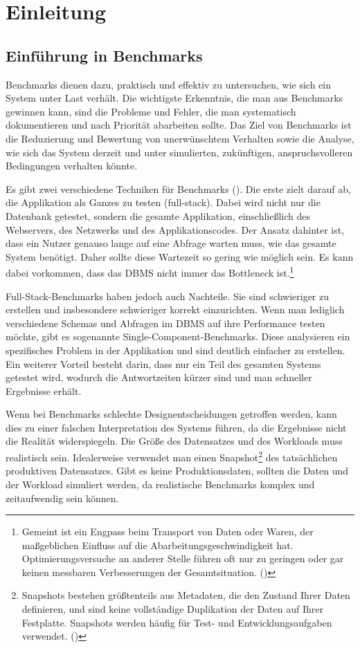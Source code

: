 \chapter{Einleitung}\label{ch:einleitung}

\section{Einführung in Benchmarks}\label{sec:einleitung-einfuehrung}

Benchmarks dienen dazu, praktisch und effektiv zu untersuchen, wie sich ein System unter Last verhält.
Die wichtigste Erkenntnis, die man aus Benchmarks gewinnen kann, sind die Probleme und Fehler, die man systematisch dokumentieren und nach Priorität abarbeiten sollte.
Das Ziel von Benchmarks ist die Reduzierung und Bewertung von unerwünschtem Verhalten sowie die Analyse, wie sich das System derzeit und unter simulierten, zukünftigen, anspruchsvolleren Bedingungen verhalten könnte.

Es gibt zwei verschiedene Techniken für Benchmarks (\cite[pp. 35--49]{schwartz2012high}).
Die erste zielt darauf ab, die Applikation als Ganzes zu testen (full-stack).
Dabei wird nicht nur die Datenbank getestet, sondern die gesamte Applikation, einschließlich des Webservers,
des Netzwerks und des Applikationscodes.
Der Ansatz dahinter ist, dass ein Nutzer genauso lange auf eine Abfrage warten muss, wie das gesamte System benötigt.
Daher sollte diese Wartezeit so gering wie möglich sein.
Es kann dabei vorkommen, dass das DBMS nicht immer das Bottleneck ist.\footnote{Gemeint ist ein Engpass beim Transport von Daten oder Waren, der maßgeblichen Einfluss auf die Abarbeitungsgeschwindigkeit hat. Optimierungsversuche an anderer Stelle führen oft nur zu geringen oder gar keinen messbaren Verbesserungen der Gesamtsituation. (\cite{bottleneck})}

Full-Stack-Benchmarks haben jedoch auch Nachteile.
Sie sind schwieriger zu erstellen und insbesondere schwieriger korrekt einzurichten.
Wenn man lediglich verschiedene Schemas und Abfragen im DBMS auf ihre Performance testen möchte, gibt es sogenannte Single-Component-Benchmarks.
Diese analysieren ein spezifisches Problem in der Applikation und sind deutlich einfacher zu erstellen.
Ein weiterer Vorteil besteht darin, dass nur ein Teil des gesamten Systems getestet wird, wodurch die Antwortzeiten
kürzer sind und man schneller Ergebnisse erhält.

Wenn bei Benchmarks schlechte Designentscheidungen getroffen werden, kann dies zu einer falschen Interpretation des Systems führen, da die Ergebnisse nicht die Realität widerspiegeln.
Die Größe des Datensatzes und des Workloads muss realistisch sein.
Idealerweise verwendet man einen Snapshot\footnote{Snapshots bestehen größtenteils aus Metadaten, die den Zustand Ihrer Daten definieren, und sind keine vollständige Duplikation der Daten auf Ihrer Festplatte. Snapshots werden häufig für Test- und Entwicklungsaufgaben verwendet. (\cite{snapshot}) } des tatsächlichen produktiven Datensatzes.
Gibt es keine Produktionsdaten, sollten die Daten und der Workload simuliert werden, da realistische Benchmarks komplex und zeitaufwendig sein können.

